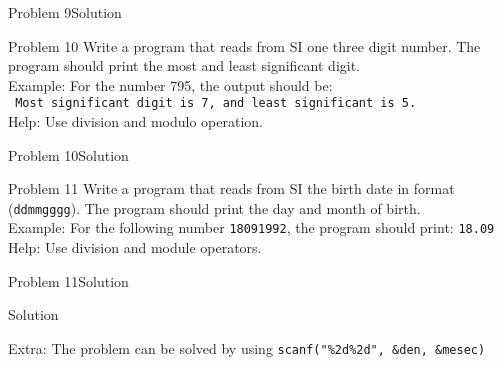 \begin{frame}[fragile]{Problem 9}{Solution}
	
\end{frame}


\begin{frame}[fragile]{Problem 10}
Write a program that reads from SI one three digit number. The program should
print the most and least significant digit.\\ 
Example: For the number 795, the output should be:\\
\texttt{	Most significant digit is 7, and least significant is 5.}\\
Help: Use division and modulo operation.
\end{frame}

\begin{frame}[fragile]{Problem 10}{Solution}

\end{frame}


\begin{frame}[fragile]{Problem 11}
Write a program that reads from SI the birth date in format (\texttt{ddmmgggg}).
The program should print the day and month of birth.\\
Example: For the following number \texttt{18091992}, the program should print:
\texttt{18.09}\\ Help: Use division and module operators.
\end{frame}

\begin{frame}[fragile]{Problem 11}{Solution}
	\begin{exampleblock}{Solution}
		
	\end{exampleblock}
	Extra: The problem can be solved by using
	\texttt{scanf("\%2d\%2d", \&den, \&mesec)}
\end{frame}
